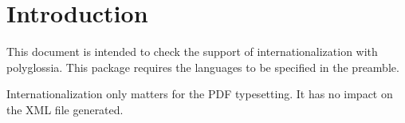 \documentclass{article}
\newcounter{Lcount}
\def\do#1{\stepcounter{Lcount}\ifnum\the\value{Lcount}=1\setmainlanguage{#1}  
\else\setotherlanguage{#1}\fi}%
\begin{document}
\section*{Introduction}
This document is intended to check the support of internationalization with 
\textsf{polyglossia}. This package requires the languages to be specified in 
the preamble.

Internationalization only matters for the PDF typesetting. It has no impact on 
the XML file generated.

\def\do#1{
\begin{#1}
\begin{quiz}{#1}
\begin{description}[tags={#1}]{Description}Text\end{description}
\begin{cloze}{Cloze}
\begin{multi}[shuffle]{Multichoice}?\item* A\item B\end{multi}
\begin{multi}[multiple,shuffle=false]{Multianswer}?\item* A\item B\end{multi}
\begin{numerical}{Numerical}?\item0\end{numerical}
\begin{shortanswer}[usecase]{Shortanswer}?\item0\end{shortanswer}
\begin{shortanswer}[usecase=false]{Shortanswer}?\item0\end{shortanswer}
\end{cloze}
\begin{essay}[template={Default}]{Essay}Text\item Info\end{essay}
\begin{essay}[response format=html+file]{Essay}Text\end{essay}
\begin{essay}[response format=text]{Essay}Text\end{essay}
\begin{essay}[response format=monospaced]{Essay}Text\end{essay}
\begin{essay}[response format=file]{Essay}Text\end{essay}
\begin{matching}[dd]{Matching}?\item A\answer1\item B\answer2\item 

\end{matching}
\end{quiz}
\end{#1}}
\end{document}
